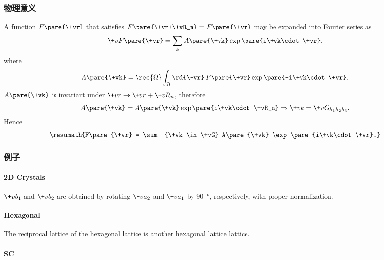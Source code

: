 \documentclass[hidelinks]{ctexart}
\begin{document}

\subsubsection{物理意义} %
\label{ssub:物理意义}

A function $F\pare{\+vr}$ that satisfies $F\pare{\+vr+\+vR_n} = F\pare{\+vr}$ may be expanded into Fourier series as
\[ \+vF\pare{\+vr} = \sum_k A\pare{\+vk}\exp\pare{i\+vk\cdot \+vr}, \]
where
\[ A\pare{\+vk} = \rec{\Omega}\int_\Omega \rd{\+vr}\, F\pare{\+vr}\exp\pare{-i\+vk\cdot \+vr}. \]
$A\pare{\+vk}$ is invariant under $\+vr \rightarrow \+vr+\+vR_n$, therefore
\[ A\pare{\+vk} = A\pare{\+vk} \exp\pare{i\+vk\cdot \+vR_n} \Rightarrow \+vk = \+vG_{h_1h_2h_3}. \]
Hence
\[ \resumath{F\pare{\+vr} = \sum_{\+vk \in \+vG} A\pare{\+vk} \exp\pare{i\+vk\cdot \+vr}.} \]


\subsubsection{例子} %
\label{ssub:例子}

\paragraph{2D Crystals} %
\label{par:2d_crystals}

$\+vb_1$ and $\+vb_2$ are obtained by rotating $\+va_2$ and $\+va_1$ by \SI{90}{\degree}, respectively, with proper normalization.


\paragraph{Hexagonal} %
\label{par:hexagonal}

The reciprocal lattice of the hexagonal lattice is another hexagonal lattice lattice.


\paragraph{SC} %
\label{par:sc}
\end{document}
